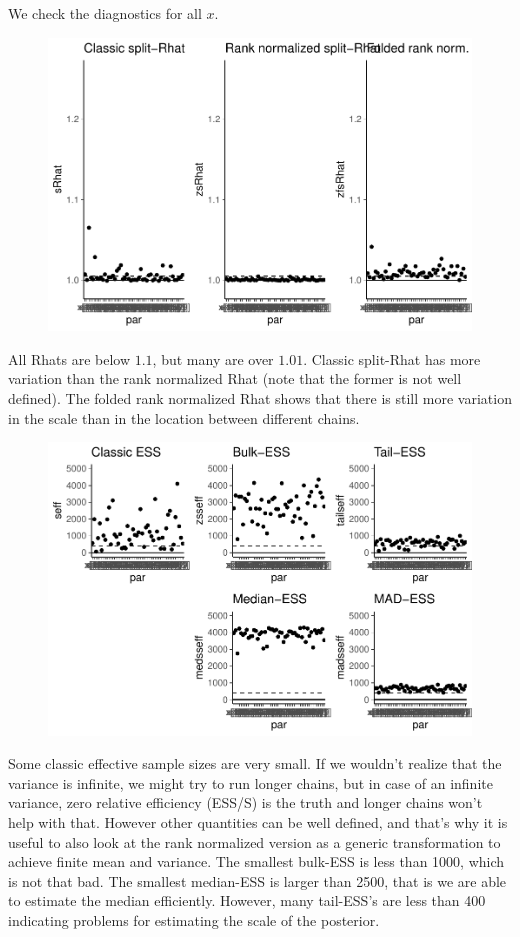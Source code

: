 \documentclass[american,]{article}
\begin{document}
We check the diagnostics for all \(x\).

\begin{figure}[t]
  \centering
  \includegraphics[width=0.6\linewidth]{graphics/rhat-fit-nom-td20-1.pdf}
\end{figure}

All Rhats are below \(1.1\), but many are over \(1.01\). Classic
split-Rhat has more variation than the rank normalized Rhat (note that
the former is not well defined). The folded rank normalized Rhat shows
that there is still more variation in the scale than in the location
between different chains.

\begin{figure}[t]
  \centering
  \includegraphics[width=0.6\linewidth]{graphics/ess-fit-nom-td20-1.pdf}
\end{figure}

Some classic effective sample sizes are very small. If we wouldn't
realize that the variance is infinite, we might try to run longer
chains, but in case of an infinite variance, zero relative efficiency
(ESS/S) is the truth and longer chains won't help with that. However
other quantities can be well defined, and that's why it is useful to
also look at the rank normalized version as a generic transformation to
achieve finite mean and variance. The smallest bulk-ESS is less than
1000, which is not that bad. The smallest median-ESS is larger than
2500, that is we are able to estimate the median efficiently. However,
many tail-ESS's are less than 400 indicating problems for estimating the
scale of the posterior.
\end{document}
